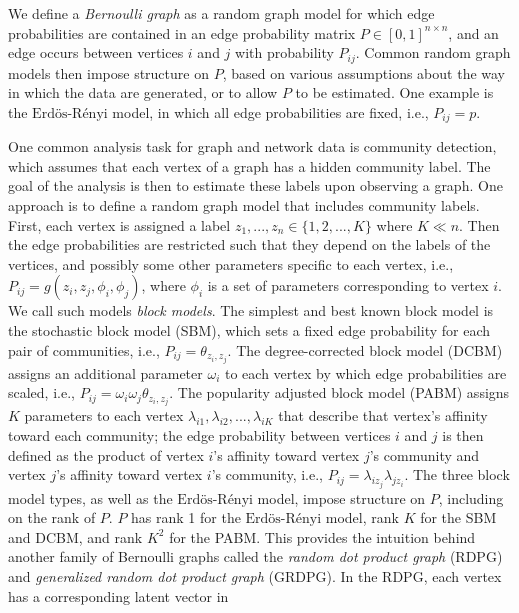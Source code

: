 \documentclass[12pt]{article}
\begin{document}
We define a \emph{Bernoulli graph} as a random graph model for which
edge probabilities are contained in an edge probability matrix
\(P \in [0, 1]^{n \times n}\), and an edge occurs between vertices \(i\)
and \(j\) with probability \(P_{ij}\). Common random graph models then
impose structure on \(P\), based on various assumptions about the way in
which the data are generated, or to allow \(P\) to be estimated. One
example is the \(\text{Erd\"{o}s-R\'{e}nyi}\) model, in which all edge
probabilities are fixed, i.e., \(P_{ij} = p\).

One common analysis task for graph and network data is community
detection, which assumes that each vertex of a graph has a hidden
community label. The goal of the analysis is then to estimate these
labels upon observing a graph. One approach is to define a random graph
model that includes community labels. First, each vertex is assigned a
label \(z_1, ..., z_n \in \{1, 2, ..., K\}\) where \(K \ll n\). Then the
edge probabilities are restricted such that they depend on the labels of
the vertices, and possibly some other parameters specific to each
vertex, i.e., \(P_{ij} = g(z_i, z_j, \phi_i, \phi_j)\), where \(\phi_i\)
is a set of parameters corresponding to vertex \(i\). We call such
models \emph{block models}. The simplest and best known block model is
the stochastic block model (SBM), which sets a fixed edge probability
for each pair of communities, i.e., \(P_{ij} = \theta_{z_i, z_j}\). The
degree-corrected block model (DCBM) assigns an additional parameter
\(\omega_i\) to each vertex by which edge probabilities are scaled,
i.e., \(P_{ij} = \omega_i \omega_j \theta_{z_i, z_j}\). The popularity
adjusted block model (PABM) assigns \(K\) parameters to each vertex
\(\lambda_{i1}, \lambda_{i2}, ..., \lambda_{iK}\) that describe that
vertex's affinity toward each community; the edge probability between
vertices \(i\) and \(j\) is then defined as the product of vertex
\(i\)'s affinity toward vertex \(j\)'s community and vertex \(j\)'s
affinity toward vertex \(i\)'s community, i.e.,
\(P_{ij} = \lambda_{i z_j} \lambda_{j z_i}\). The three block model
types, as well as the \(\text{Erd\"{o}s-R\'{e}nyi}\) model, impose
structure on \(P\), including on the rank of \(P\). \(P\) has rank 1 for
the \(\text{Erd\"{o}s-R\'{e}nyi}\) model, rank \(K\) for the SBM and
DCBM, and rank \(K^2\) for the PABM. This provides the intuition behind
another family of Bernoulli graphs called the \emph{random dot product
graph} (RDPG) and \emph{generalized random dot product graph} (GRDPG).
In the RDPG, each vertex has a corresponding latent vector in
\end{document}
